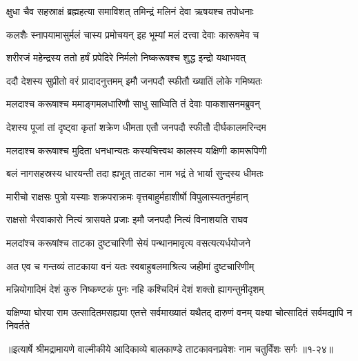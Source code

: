 \twolineshloka
{क्षुधा चैव सहस्राक्षं ब्रह्महत्या समाविशत्}
{तमिन्द्रं मलिनं देवा ऋषयश्च तपोधनाः} %

\twolineshloka
{कलशैः स्नापयामासुर्मलं चास्य प्रमोचयन्}
{इह भूम्यां मलं दत्त्वा देवाः कारूषमेव च} %

\twolineshloka
{शरीरजं महेन्द्रस्य ततो हर्षं प्रपेदिरे}
{निर्मलो निष्करूषश्च शुद्ध इन्द्रो यथाभवत्} %

\twolineshloka
{ददौ देशस्य सुप्रीतो वरं प्रादादनुत्तमम्}
{इमौ जनपदौ स्फीतौ ख्यातिं लोके गमिष्यतः} %

\twolineshloka
{मलदाश्च करूषाश्च ममाङ्गमलधारिणौ}
{साधु साध्विति तं देवाः पाकशासनमब्रुवन्} %

\twolineshloka
{देशस्य पूजां तां दृष्ट्वा कृतां शक्रेण धीमता}
{एतौ जनपदौ स्फीतौ दीर्घकालमरिन्दम} %

\twolineshloka
{मलदाश्च करूषाश्च मुदिता धनधान्यतः}
{कस्यचित्त्वथ कालस्य यक्षिणी कामरूपिणी} %

\twolineshloka
{बलं नागसहस्रस्य धारयन्ती तदा ह्यभूत्}
{ताटका नाम भद्रं ते भार्या सुन्दस्य धीमतः} %

\twolineshloka
{मारीचो राक्षसः पुत्रो यस्याः शक्रपराक्रमः}
{वृत्तबाहुर्महाशीर्षो विपुलास्यतनुर्महान्} %

\twolineshloka
{राक्षसो भैरवाकारो नित्यं त्रासयते प्रजाः}
{इमौ जनपदौ नित्यं विनाशयति राघव} %

\twolineshloka
{मलदांश्च करूषांश्च ताटका दुष्टचारिणी}
{सेयं पन्थानमावृत्य वसत्यत्यर्धयोजने} %

\twolineshloka
{अत एव च गन्तव्यं ताटकाया वनं यतः}
{स्वबाहुबलमाश्रित्य जहीमां दुष्टचारिणीम्} %

\twolineshloka
{मन्नियोगादिमं देशं कुरु निष्कण्टकं पुनः}
{नहि कश्चिदिमं देशं शक्तो ह्यागन्तुमीदृशम्} %

\threelineshloka
{यक्षिण्या घोरया राम उत्सादितमसह्यया}
{एतत्ते सर्वमाख्यातं यथैतद् दारुणं वनम्}
{यक्ष्या चोत्सादितं सर्वमद्यापि न निवर्तते} %


॥इत्यार्षे श्रीमद्रामायणे वाल्मीकीये आदिकाव्ये बालकाण्डे ताटकावनप्रवेशः नाम चतुर्विंशः सर्गः ॥१-२४॥
